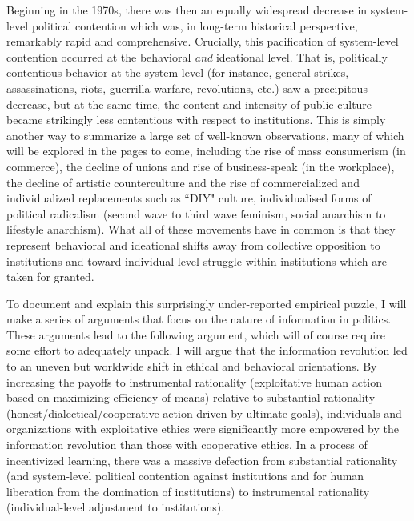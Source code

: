 \documentclass[12pt,book]{article}
\begin{document}
Beginning in the 1970s, there was then an equally widespread decrease in
system-level political contention which was, in long-term historical
perspective, remarkably rapid and comprehensive. Crucially, this
pacification of system-level contention occurred at the behavioral
\emph{and} ideational level. That is, politically contentious behavior
at the system-level (for instance, general strikes, assassinations,
riots, guerrilla warfare, revolutions, etc.) saw a precipitous decrease,
but at the same time, the content and intensity of public culture became
strikingly less contentious with respect to institutions. This is simply
another way to summarize a large set of well-known observations, many of
which will be explored in the pages to come, including the rise of mass
consumerism (in commerce), the decline of unions and rise of
business-speak (in the workplace), the decline of artistic
counterculture and the rise of commercialized and individualized
replacements such as ``DIY" culture, individualised forms of political
radicalism (second wave to third wave feminism, social anarchism to
lifestyle anarchism). What all of these movements have in common is that
they represent behavioral and ideational shifts away from collective
opposition to institutions and toward individual-level struggle within
institutions which are taken for granted.

To document and explain this surprisingly under-reported empirical
puzzle, I will make a series of arguments that focus on the nature of
information in politics. These arguments lead to the following argument,
which will of course require some effort to adequately unpack. I will
argue that the information revolution led to an uneven but worldwide
shift in ethical and behavioral orientations. By increasing the payoffs
to instrumental rationality (exploitative human action based on
maximizing efficiency of means) relative to substantial rationality
(honest/dialectical/cooperative action driven by ultimate goals),
individuals and organizations with exploitative ethics were
significantly more empowered by the information revolution than those
with cooperative ethics. In a process of incentivized learning, there
was a massive defection from substantial rationality (and system-level
political contention against institutions and for human liberation from
the domination of institutions) to instrumental rationality
(individual-level adjustment to institutions).
\end{document}
